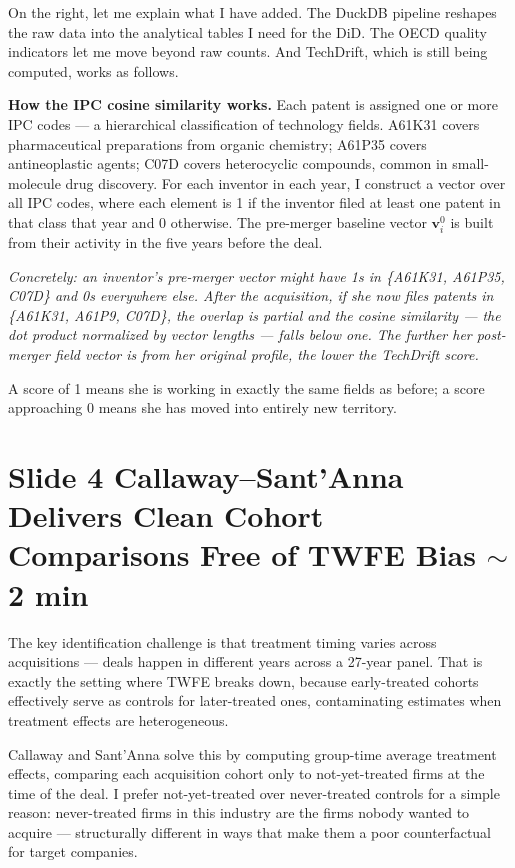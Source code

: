 \documentclass[11pt,a4paper]{article}
\newcommand{\example}[1]{%
  \begin{trivlist}
    \item\relax
    \colorbox{examplebg}{\parbox{\dimexpr\linewidth-2\fboxsep}%
      {\small\itshape\color{darkblue!80} #1}}
  \end{trivlist}%
}
\begin{document}
On the right, let me explain what I have added. The DuckDB pipeline reshapes the raw data into the analytical tables I need for the DiD. The OECD quality indicators let me move beyond raw counts. And TechDrift, which is still being computed, works as follows.

\textbf{How the IPC cosine similarity works.} Each patent is assigned one or more IPC codes --- a hierarchical classification of technology fields. A61K31 covers pharmaceutical preparations from organic chemistry; A61P35 covers antineoplastic agents; C07D covers heterocyclic compounds, common in small-molecule drug discovery. For each inventor in each year, I construct a vector over all IPC codes, where each element is 1 if the inventor filed at least one patent in that class that year and 0 otherwise. The pre-merger baseline vector $\mathbf{v}_i^0$ is built from their activity in the five years before the deal.

\example{Concretely: an inventor's pre-merger vector might have 1s in \{A61K31, A61P35, C07D\} and 0s everywhere else. After the acquisition, if she now files patents in \{A61K31, A61P9, C07D\}, the overlap is partial and the cosine similarity --- the dot product normalized by vector lengths --- falls below one. The further her post-merger field vector is from her original profile, the lower the TechDrift score.}

A score of 1 means she is working in exactly the same fields as before; a score approaching 0 means she has moved into entirely new territory.

\section*{Slide 4 \quad Callaway--Sant'Anna Delivers Clean Cohort Comparisons Free of TWFE Bias \hfill{\normalfont\small\color{midgray}$\sim$2 min}}

The key identification challenge is that treatment timing varies across acquisitions --- deals happen in different years across a 27-year panel. That is exactly the setting where TWFE breaks down, because early-treated cohorts effectively serve as controls for later-treated ones, contaminating estimates when treatment effects are heterogeneous.

Callaway and Sant'Anna solve this by computing group-time average treatment effects, comparing each acquisition cohort only to not-yet-treated firms at the time of the deal. I prefer not-yet-treated over never-treated controls for a simple reason: never-treated firms in this industry are the firms nobody wanted to acquire --- structurally different in ways that make them a poor counterfactual for target companies.
\end{document}
